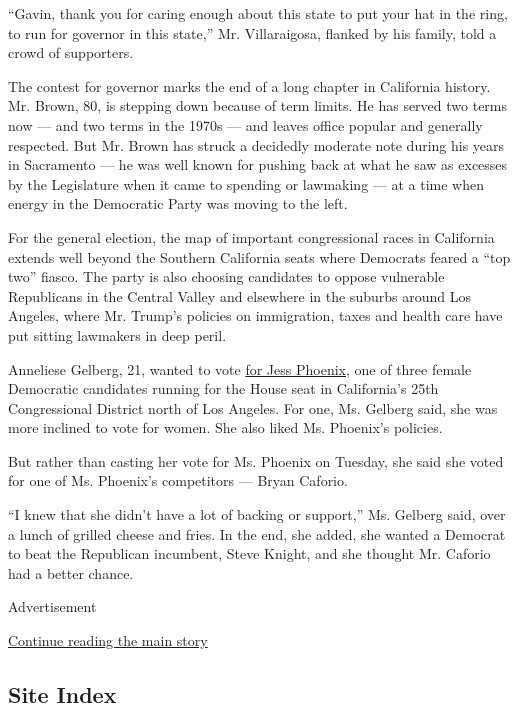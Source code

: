 ``Gavin, thank you for caring enough about this state to put your hat in
the ring, to run for governor in this state,'' Mr. Villaraigosa, flanked
by his family, told a crowd of supporters.

The contest for governor marks the end of a long chapter in California
history. Mr. Brown, 80, is stepping down because of term limits. He has
served two terms now --- and two terms in the 1970s --- and leaves
office popular and generally respected. But Mr. Brown has struck a
decidedly moderate note during his years in Sacramento --- he was well
known for pushing back at what he saw as excesses by the Legislature
when it came to spending or lawmaking --- at a time when energy in the
Democratic Party was moving to the left.

For the general election, the map of important congressional races in
California extends well beyond the Southern California seats where
Democrats feared a ``top two'' fiasco. The party is also choosing
candidates to oppose vulnerable Republicans in the Central Valley and
elsewhere in the suburbs around Los Angeles, where Mr. Trump's policies
on immigration, taxes and health care have put sitting lawmakers in deep
peril.

Anneliese Gelberg, 21, wanted to vote
\href{https://www.nytimes3xbfgragh.onion/2018/05/30/us/politics/jess-phoenix-congress-climate-change.html}{for
Jess Phoenix}, one of three female Democratic candidates running for the
House seat in California's 25th Congressional District north of Los
Angeles. For one, Ms. Gelberg said, she was more inclined to vote for
women. She also liked Ms. Phoenix's policies.

But rather than casting her vote for Ms. Phoenix on Tuesday, she said
she voted for one of Ms. Phoenix's competitors --- Bryan Caforio.

``I knew that she didn't have a lot of backing or support,'' Ms. Gelberg
said, over a lunch of grilled cheese and fries. In the end, she added,
she wanted a Democrat to beat the Republican incumbent, Steve Knight,
and she thought Mr. Caforio had a better chance.

Advertisement

\protect\hyperlink{after-bottom}{Continue reading the main story}

\hypertarget{site-index}{%
\subsection{Site Index}\label{site-index}}

